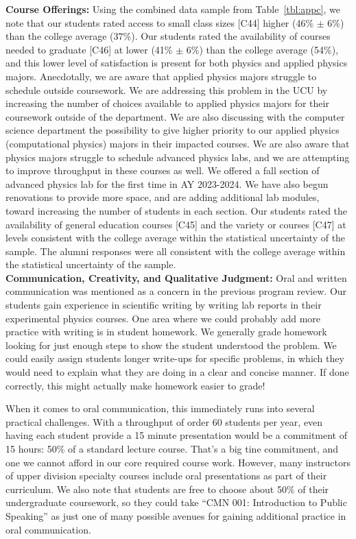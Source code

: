 \documentclass[12pt]{article}
\begin{document}
\noindent
{\bf Course Offerings:} Using the combined data sample from
Table~\ref{tbl:appc}, we note that our students rated access to small
class sizes [C44] higher (46\% $\pm$ 6\%) than the college average
($37\%$).  Our students rated the availability of courses needed to
graduate [C46] at lower (41\% $\pm$ 6\%) than the college average
(54\%), and this lower level of satisfaction is present for both
physics and applied physics majors.  Anecdotally, we are aware that
applied physics majors struggle to schedule outside coursework.
We are addressing this problem in the UCU by increasing the number of
choices available to applied physics majors for their coursework
outside of the department.  We are also discussing with the computer
science department the possibility to give higher priority to our
applied physics (computational physics) majors in their impacted
courses.  We are also aware that physics majors struggle to schedule
advanced physics labs, and we are attempting to improve throughput in
these courses as well.  We offered a fall section of advanced physics
lab for the first time in AY 2023-2024.  We have also begun
renovations to provide more space, and are adding additional lab
modules, toward increasing the number of students in each section.
Our students rated the availability of general education courses [C45]
and the variety or courses [C47] at levels consistent with the college
average within the statistical uncertainty of the sample.  The alumni
responses were all consistent with the college average within the
statistical uncertainty of the sample.\\[3pt]

\noindent
{\bf Communication, Creativity, and Qualitative Judgment:} Oral and
written communication was mentioned as a concern in the previous
program review.  Our students gain experience in scientific writing by
writing lab reports in their experimental physics courses.  One area
where we could probably add more practice with writing is in student
homework.  We generally grade homework looking for just enough steps
to show the student understood the problem.  We could easily assign
students longer write-ups for specific problems, in which they would
need to explain what they are doing in a clear and concise manner.
If done correctly, this might actually make homework easier to grade!

When it comes to oral communication, this immediately runs into
several practical challenges.  With a throughput of order 60 students
per year, even having each student provide a 15 minute presentation
would be a commitment of 15 hours: 50\% of a standard lecture course.
That's a big tine commitment, and one we cannot afford in our core
required course work.  However, many instructors of upper division
specialty courses include oral presentations as part of their
curriculum.  We also note that students are free to choose about 50\%
of their undergraduate coursework, so they could take ``CMN 001:
Introduction to Public Speaking'' as just one of many possible avenues
for gaining additional practice in oral communication.
\end{document}
